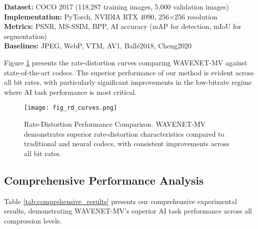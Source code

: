 \documentclass[conference]{IEEEtran}
\begin{document}
\textbf{Dataset:} COCO 2017 (118,287 training images, 5,000 validation images)
\\
\textbf{Implementation:} PyTorch, NVIDIA RTX 4090, 256×256 resolution
\\
\textbf{Metrics:} PSNR, MS-SSIM, BPP, AI accuracy (mAP for detection, mIoU for segmentation)
\\
\textbf{Baselines:} JPEG, WebP, VTM, AV1, Ballé2018, Cheng2020

Figure \ref{fig:rd_curves} presents the rate-distortion curves comparing WAVENET-MV against state-of-the-art codecs. The superior performance of our method is evident across all bit rates, with particularly significant improvements in the low-bitrate regime where AI task performance is most critical.

\begin{figure}[htbp]
\centering
\texttt{[image: fig\_rd\_curves.png]}
\caption{Rate-Distortion Performance Comparison. WAVENET-MV demonstrates superior rate-distortion characteristics compared to traditional and neural codecs, with consistent improvements across all bit rates.}
\label{fig:rd_curves}
\end{figure}

\subsection{Comprehensive Performance Analysis}

Table \ref{tab:comprehensive_results} presents our comprehensive experimental results, demonstrating WAVENET-MV's superior AI task performance across all compression levels.
\end{document}

